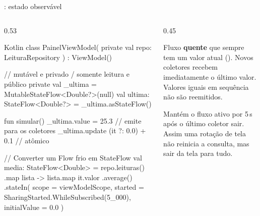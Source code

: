 \documentclass[aspectratio=169,10pt]{beamer}
\begin{document}
\begin{frame}[fragile]{: estado observável}
  \begin{columns}[T]
    \begin{column}{0.53\textwidth}
\begin{codigo}[title=Padrão do ViewModel]{Kotlin}
class PainelViewModel(
  private val repo: LeituraRepository
) : ViewModel() {
  // mutável e privado / somente leitura e público
  private val _ultima = MutableStateFlow<Double?>(null)
  val ultima: StateFlow<Double?> = _ultima.asStateFlow()

  fun simular() {
    _ultima.value = 25.3     // emite para os coletores
    _ultima.update { (it ?: 0.0) + 0.1 }  // atômico
  }

  // Converter um Flow frio em StateFlow
  val media: StateFlow<Double> = repo.leituras()
    .map { lista -> lista.map { it.valor }.average() }
    .stateIn(
      scope = viewModelScope,
      started = SharingStarted.WhileSubscribed(5_000),
      initialValue = 0.0
    )
}
\end{codigo}
    \end{column}
    \begin{column}{0.45\textwidth}
      \begin{conceito}[StateFlow]
        Fluxo \textbf{quente} que sempre tem um valor atual (). Novos coletores recebem imediatamente o último valor. Valores iguais em sequência não são reemitidos.
      \end{conceito}
      \begin{dica}
        Mantém o fluxo ativo por 5\,s após o último coletor sair. Assim uma rotação de tela não reinicia a consulta, mas sair da tela para tudo.
      \end{dica}
      \begin{conceito}[Na UI (Módulo 07)]
        \\
      \end{conceito}
    \end{column}
  \end{columns}
\end{frame}
\end{document}
